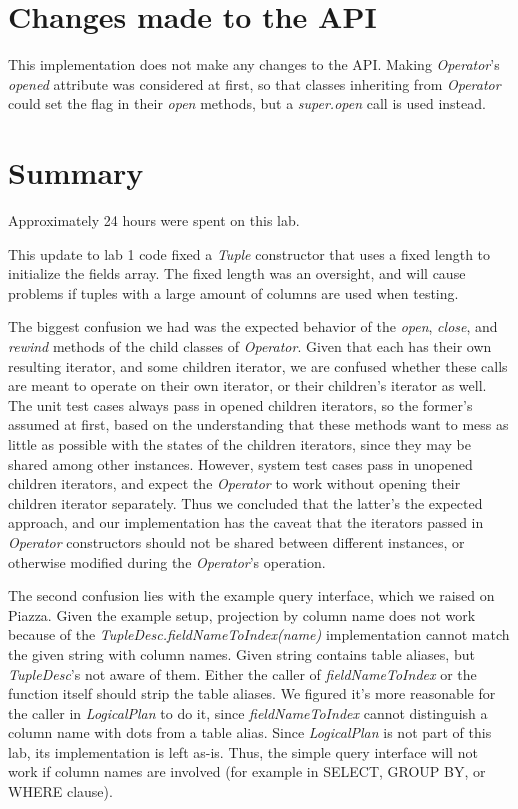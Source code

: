 \documentclass[11pt]{article}
\begin{document}
\section{Changes made to the API}

This implementation does not make any changes to the API. Making \textit{Operator}'s \textit{opened} attribute was considered at first, so that classes inheriting from \textit{Operator} could set the flag in their \textit{open} methods, but a \textit{super.open} call is used instead.

\section{Summary}

Approximately 24 hours were spent on this lab.

This update to lab 1 code fixed a \textit{Tuple} constructor that uses a fixed length to initialize the fields array. The fixed length was an oversight, and will cause problems if tuples with a large amount of columns are used when testing.

The biggest confusion we had was the expected behavior of the \textit{open}, \textit{close}, and \textit{rewind} methods of the child classes of \textit{Operator}. Given that each has their own resulting iterator, and some children iterator, we are confused whether these calls are meant to operate on their own iterator, or their children's iterator as well. The unit test cases always pass in opened children iterators, so the former's assumed at first, based on the understanding that these methods want to mess as little as possible with the states of the children iterators, since they may be shared among other instances. However, system test cases pass in unopened children iterators, and expect the \textit{Operator} to work without opening their children iterator separately. Thus we concluded that the latter's the expected approach, and our implementation has the caveat that the iterators passed in \textit{Operator} constructors should not be shared between different instances, or otherwise modified during the \textit{Operator}'s operation.

The second confusion lies with the example query interface, which we raised on Piazza. Given the example setup, projection by column name does not work because of the \textit{TupleDesc.fieldNameToIndex(name)} implementation cannot match the given string with column names. Given string contains table aliases, but \textit{TupleDesc}'s not aware of them. Either the caller of \textit{fieldNameToIndex} or the function itself should strip the table aliases. We figured it's more reasonable for the caller in \textit{LogicalPlan} to do it, since \textit{fieldNameToIndex} cannot distinguish a column name with dots from a table alias. Since \textit{LogicalPlan} is not part of this lab, its implementation is left as-is. Thus, the simple query interface will not work if column names are involved (for example in SELECT, GROUP BY, or WHERE clause).
\end{document}
